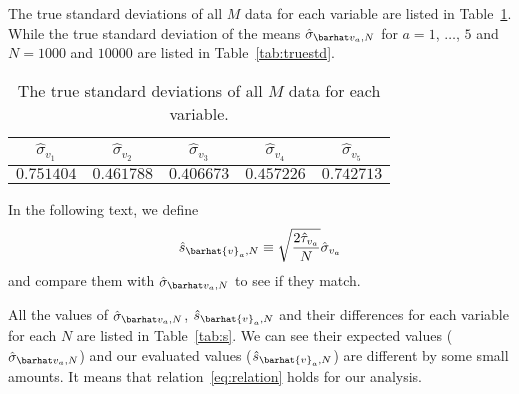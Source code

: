 The true standard deviations of all \(M\) data for each variable are
listed in Table~\ref{tab:std}.
While the true standard deviation of the means
\(\sgbar{a}\) for \(a = 1\), \(\ldots\), \(5\) and \(N = 1000\) and \(10000\) are
listed in Table~\ref{tab:truestd}.

\begin{table}[H]
    \centering
    \caption{The true standard deviations of all \(M\) data for each variable.}
    \label{tab:std}
    \begin{tabular}{@{}ccccc@{}}
        \toprule
        \(\hat{\sigma}_{v_1}\) & \(\hat{\sigma}_{v_2}\) & \(\hat{\sigma}_{v_3}\) & \(\hat{\sigma}_{v_4}\) & \(\hat{\sigma}_{v_5}\) \\
        \midrule
        \(0.751404\)           & \(0.461788\)           & \(0.406673\)           & \(0.457226\)           & \(0.742713\)           \\
        \bottomrule
    \end{tabular}
\end{table}

In the following text, we define
%
\begin{equation}
    \hat{s}_{\barhat{v}_a,N} \equiv \sqrt{\frac{ 2 \hat{\tau}_{v_a} }{ N }} \hat{\sigma}_{v_a}
\end{equation}
%
and compare them with \(\sgbar{a}\) to see if they match.

All the values of \(\sgbar{a}\), \(\hat{s}_{\barhat{v}_a,N}\) and their differences
for each variable for each \(N\) are listed in Table~\ref{tab:s}.
We can see their expected values (\(\sgbar{a}\)) and our evaluated values
(\(\hat{s}_{\barhat{v}_a,N}\)) are different by some small amounts.
It means that relation~\eqref{eq:relation} holds for our analysis.

